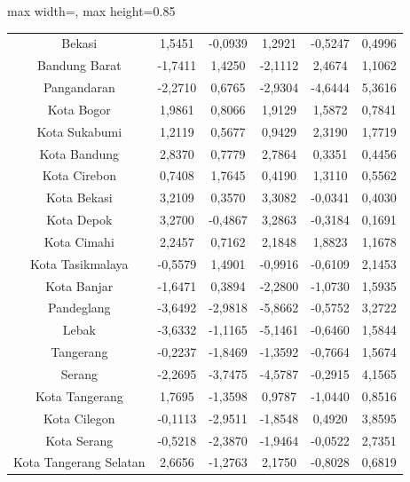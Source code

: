 \begin{table}[H]
\begin{adjustbox}{max width=\textwidth, max height=0.85\textheight}
\begin{tabular}{|c|c|c|c|c|c|}
Bekasi & 1,5451 & -0,0939 & 1,2921 & -0,5247 & 0,4996 \\
Bandung Barat & -1,7411 & 1,4250 & -2,1112 & 2,4674 & 1,1062 \\
Pangandaran & -2,2710 & 0,6765 & -2,9304 & -4,6444 & 5,3616 \\
Kota Bogor & 1,9861 & 0,8066 & 1,9129 & 1,5872 & 0,7841 \\
Kota Sukabumi & 1,2119 & 0,5677 & 0,9429 & 2,3190 & 1,7719 \\
Kota Bandung & 2,8370 & 0,7779 & 2,7864 & 0,3351 & 0,4456 \\
Kota Cirebon & 0,7408 & 1,7645 & 0,4190 & 1,3110 & 0,5562 \\
Kota Bekasi & 3,2109 & 0,3570 & 3,3082 & -0,0341 & 0,4030 \\
Kota Depok & 3,2700 & -0,4867 & 3,2863 & -0,3184 & 0,1691 \\
Kota Cimahi & 2,2457 & 0,7162 & 2,1848 & 1,8823 & 1,1678 \\
Kota Tasikmalaya & -0,5579 & 1,4901 & -0,9916 & -0,6109 & 2,1453 \\
Kota Banjar & -1,6471 & 0,3894 & -2,2800 & -1,0730 & 1,5935 \\
Pandeglang & -3,6492 & -2,9818 & -5,8662 & -0,5752 & 3,2722 \\
Lebak & -3,6332 & -1,1165 & -5,1461 & -0,6460 & 1,5844 \\
Tangerang & -0,2237 & -1,8469 & -1,3592 & -0,7664 & 1,5674 \\
Serang & -2,2695 & -3,7475 & -4,5787 & -0,2915 & 4,1565 \\
Kota Tangerang & 1,7695 & -1,3598 & 0,9787 & -1,0440 & 0,8516 \\
Kota Cilegon & -0,1113 & -2,9511 & -1,8548 & 0,4920 & 3,8595 \\
Kota Serang & -0,5218 & -2,3870 & -1,9464 & -0,0522 & 2,7351 \\
Kota Tangerang Selatan & 2,6656 & -1,2763 & 2,1750 & -0,8028 & 0,6819 \\
\hline
\end{tabular}
\end{adjustbox}
\end{table}